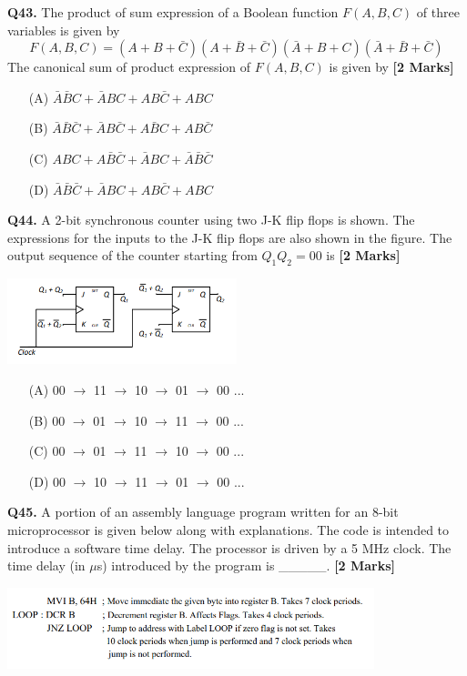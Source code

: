 \documentclass[11pt]{article}
\newcommand{\questionb}[2]{
    \noindent\textbf{Q#2.} #1 \hfill \textbf{[2 Marks]}
}
\begin{document}
\questionb{The product of sum expression of a Boolean function \(F(A, B, C)\) of three variables is given by
\[
F(A, B, C) = (A + B + \bar{C})(A + \bar{B} + \bar{C})(\bar{A} + B + C)(\bar{A} + \bar{B} + \bar{C})
\]
The canonical sum of product expression of \(F(A, B, C)\) is given by}{43}
\begin{enumerate}
    \item[(A)] \(\bar{A}\bar{B}C + \bar{A}BC + AB\bar{C} + ABC\)
    \item[(B)] \(\bar{A}\bar{B}\bar{C} + \bar{A}B\bar{C} + A\bar{B}C + AB\bar{C}\)
    \item[(C)] \(ABC + A\bar{B}\bar{C} + \bar{A}BC + \bar{A}\bar{B}\bar{C}\)
    \item[(D)] \(\bar{A}\bar{B}\bar{C} + \bar{A}BC + AB\bar{C} + ABC\)
\end{enumerate}
\vspace{0.5cm}

\questionb{A 2-bit synchronous counter using two J-K flip flops is shown. The expressions for the inputs to the J-K flip flops are also shown in the figure. The output sequence of the counter starting from \(Q_1Q_2 = 00\) is}{44}
\begin{center}
\includegraphics[width=0.5\textwidth]{figures/44.png}
\end{center}
\begin{enumerate}
    \item[(A)] 00 \(\rightarrow\) 11 \(\rightarrow\) 10 \(\rightarrow\) 01 \(\rightarrow\) 00 ...
    \item[(B)] 00 \(\rightarrow\) 01 \(\rightarrow\) 10 \(\rightarrow\) 11 \(\rightarrow\) 00 ...
    \item[(C)] 00 \(\rightarrow\) 01 \(\rightarrow\) 11 \(\rightarrow\) 10 \(\rightarrow\) 00 ...
    \item[(D)] 00 \(\rightarrow\) 10 \(\rightarrow\) 11 \(\rightarrow\) 01 \(\rightarrow\) 00 ...
\end{enumerate}
\vspace{0.5cm}

\questionb{A portion of an assembly language program written for an 8-bit microprocessor is given below along with explanations. The code is intended to introduce a software time delay. The processor is driven by a 5 MHz clock. The time delay (in \(\mu\)s) introduced by the program is \_\_\_\_\_.}{45}
\begin{center}
\includegraphics[width=0.8\textwidth]{figures/45.png}
\end{center}
\vspace{0.5cm}
\end{document}
